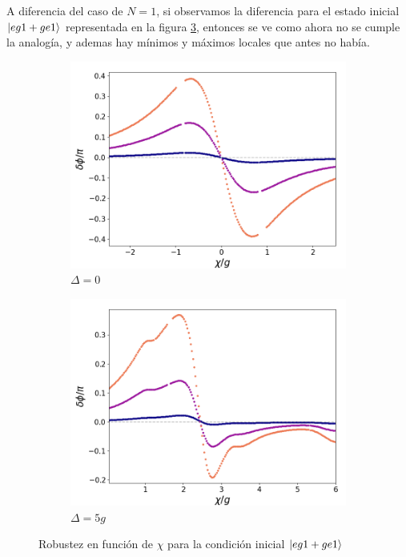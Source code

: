 A diferencia del caso de $N=1$, si observamos la diferencia para el estado inicial $\ket{eg1+ge1}$ representada en la figura \ref{fig5:robustez kerr eg1}, entonces se ve como ahora no se cumple la analogía, y ademas hay mínimos y máximos locales que antes no había. 

\begin{figure}[h]
    \centering
    \begin{subfigure}{0.49\textwidth}
        \includegraphics[width=\textwidth]{figuras/ch5/robustez/chi/eg1+ge1 chi zoom.png}
        \caption{$\Delta=0$}
        \label{fig5:robustez kerr 1 eg1}
    \end{subfigure}
    \hfill
    \begin{subfigure}{0.49\textwidth}
        \includegraphics[width=\textwidth]{figuras/ch5/robustez/chi/eg1+ge1 chi d=5.0g.png}
        \caption{$\Delta=5g$}
        \label{fig5:robustez kerr 2 eg1}
    \end{subfigure}
    \caption{Robustez en función de $\chi$ para la condición inicial $\ket{eg1+ge1}$}
    \label{fig5:robustez kerr eg1}
\end{figure}


